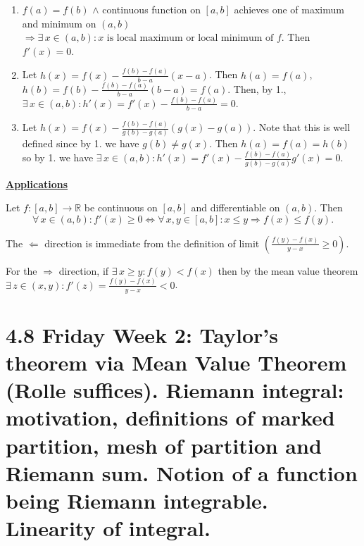 \documentclass{notes}
\begin{document}
\begin{prf}
  \begin{enumerate}
    \item $f(a) = f(b)$ $\land$ continuous function on $[a, b]$ achieves one of maximum and minimum on $(a, b)$ $\Rightarrow \exists \, x \in (a, b): \text{$x$ is local maximum or local minimum of $f$}$.
    Then $f'(x) = 0$.
    
    \item Let $h(x) = f(x) - \frac{f(b) - f(a)}{b - a} (x - a)$.
    Then $h(a) = f(a)$, $h(b) = f(b) - \frac{f(b) - f(a)}{b - a} (b - a) = f(a)$.
    Then, by 1., $\exists \, x \in (a, b): h'(x) = f'(x) - \frac{f(b) - f(a)}{b - a} = 0$.
    
    \item Let $h(x) = f(x) - \frac{f(b) - f(a)}{g(b) - g(a)} (g(x) - g(a))$.
    Note that this is well defined since by 1. we have $g(b) \neq g(x)$. %
    Then $h(a) = f(a) = h(b)$ so by 1. we have $\exists \, x \in (a, b): h'(x) = f'(x) - \frac{f(b) - f(a)}{g(b) - g(a)} g'(x) = 0$.
  \end{enumerate}
\end{prf}

{\boldmath \bfseries \underline{Applications}}

\begin{lem}
  Let $f \colon [a, b] \to \mathbb R$ be continuous on $[a, b]$ and differentiable on $(a, b)$.
  Then 
  \[
    \forall \, x \in (a, b): f'(x) \geq 0 \Leftrightarrow \forall \, x, y \in [a, b]: x \leq y \Rightarrow f(x) \leq f(y).
  \]
\end{lem}

\begin{prf}
  The $\Leftarrow$ direction is immediate from the definition of limit $\left ( \frac{f(y) - f(x)}{y - x} \geq 0 \right )$.
  
  For the $\Rightarrow$ direction, if $\exists \, x \geq y: f(y) < f(x)$ then by the mean value theorem $\exists \, z \in (x, y): f'(z) = \frac{f(y) - f(x)}{y - x} < 0$.
\end{prf}

\section{4.8 Friday Week 2: Taylor's theorem via Mean Value Theorem (Rolle suffices). Riemann integral: motivation, definitions of marked partition, mesh of partition and Riemann sum. Notion of a function being Riemann integrable. Linearity of integral.}
\end{document}
